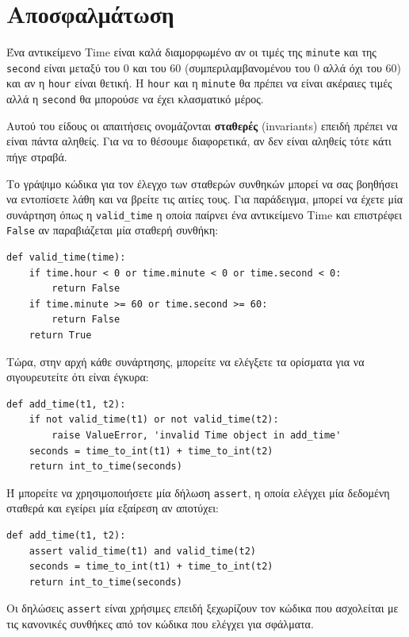 \documentclass[10pt]{book}
\begin{document}
\section{Αποσφαλμάτωση}

Ένα αντικείμενο Time είναι καλά διαμορφωμένο αν οι τιμές της {\tt minute} και της {\tt second} είναι
μεταξύ του 0 και του 60 (συμπεριλαμβανομένου του 0 αλλά όχι του 60) και αν η {\tt hour} είναι θετική.
Η {\tt hour} και η {\tt minute} θα πρέπει να είναι ακέραιες τιμές αλλά η {\tt second} θα μπορούσε να έχει
κλασματικό μέρος.

Αυτού του είδους οι απαιτήσεις ονομάζονται {\bf σταθερές} (invariants) επειδή πρέπει να είναι πάντα αληθείς.
Για να το θέσουμε διαφορετικά, αν δεν είναι αληθείς τότε κάτι πήγε στραβά.

Το γράψιμο κώδικα για τον έλεγχο των σταθερών συνθηκών μπορεί να σας βοηθήσει να εντοπίσετε λάθη και να βρείτε
τις αιτίες τους. Για παράδειγμα, μπορεί να έχετε μία συνάρτηση όπως η \verb"valid_time" η οποία παίρνει ένα αντικείμενο  Time  και επιστρέφει {\tt False} αν παραβιάζεται μία σταθερή συνθήκη:

\begin{verbatim}
def valid_time(time):
    if time.hour < 0 or time.minute < 0 or time.second < 0:
        return False
    if time.minute >= 60 or time.second >= 60:
        return False
    return True
\end{verbatim}
%
Τώρα, στην αρχή κάθε συνάρτησης, μπορείτε να ελέγξετε τα ορίσματα για να σιγουρευτείτε ότι είναι έγκυρα:

\begin{verbatim}
def add_time(t1, t2):
    if not valid_time(t1) or not valid_time(t2):
        raise ValueError, 'invalid Time object in add_time'
    seconds = time_to_int(t1) + time_to_int(t2)
    return int_to_time(seconds)
\end{verbatim}
%
Ή μπορείτε να χρησιμοποιήσετε μία δήλωση {\tt assert}, η οποία ελέγχει μία δεδομένη σταθερά και εγείρει
μία εξαίρεση αν αποτύχει:

\begin{verbatim}
def add_time(t1, t2):
    assert valid_time(t1) and valid_time(t2)
    seconds = time_to_int(t1) + time_to_int(t2)
    return int_to_time(seconds)
\end{verbatim}
%
Οι δηλώσεις {\tt assert} είναι χρήσιμες επειδή ξεχωρίζουν τον κώδικα που ασχολείται με τις κανονικές συνθήκες
από τον κώδικα που ελέγχει για σφάλματα.
\end{document}
